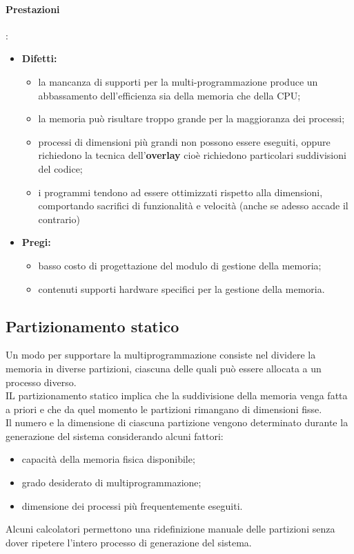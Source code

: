 \documentclass[12pt, letterpaper]{report}
\begin{document}
	\paragraph{Prestazioni}:
	\begin{itemize}
		\item \textbf{Difetti:}
		\begin{itemize}
			\item la mancanza di supporti per la multi-programmazione produce un abbassamento dell'efficienza sia della memoria che della CPU;
			\item la memoria può risultare troppo grande per la maggioranza dei processi;
			\item processi di dimensioni più grandi non possono essere eseguiti, oppure richiedono la tecnica dell'\textbf{overlay} cioè richiedono particolari suddivisioni del codice;
			\item i programmi tendono ad essere ottimizzati rispetto alla dimensioni, comportando sacrifici di funzionalità e velocità (anche se adesso accade il contrario)
		\end{itemize}
		\item \textbf{Pregi:}
		\begin{itemize}
			\item basso costo di progettazione del modulo di gestione della memoria;
			\item contenuti supporti hardware specifici per la gestione della memoria.
		\end{itemize}
	\end{itemize}
	\subsection{Partizionamento statico}
	Un modo per supportare la multiprogrammazione consiste nel dividere la memoria in diverse partizioni, ciascuna delle quali può essere allocata a un processo diverso. \\
	IL partizionamento statico implica che la suddivisione della memoria venga fatta a priori e che da quel momento le partizioni rimangano di dimensioni fisse. \\
	Il numero e la dimensione di ciascuna partizione vengono determinato durante la generazione del sistema considerando alcuni fattori:
	\begin{itemize}
		\item capacità della memoria fisica disponibile;
		\item grado desiderato di multiprogrammazione;
		\item dimensione dei processi più frequentemente eseguiti.
	\end{itemize}
	Alcuni calcolatori permettono una ridefinizione manuale delle partizioni senza dover ripetere l'intero processo di generazione del sistema. \\
\end{document}
